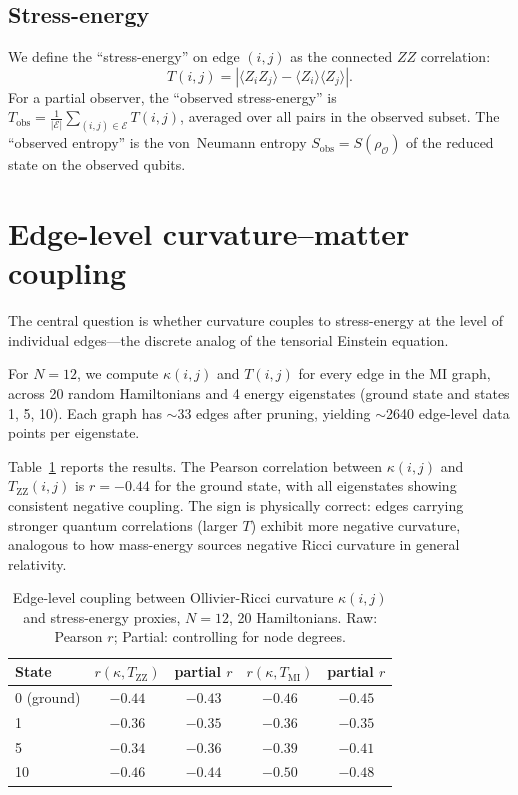 \documentclass[aps,pra,twocolumn,superscriptaddress,floatfix]{revtex4-2}
\begin{document}
\subsection{Stress-energy}

We define the ``stress-energy'' on edge $(i,j)$ as the
connected $ZZ$ correlation:
\begin{equation}
T(i,j) = |\langle Z_i Z_j \rangle - \langle Z_i \rangle
\langle Z_j \rangle|.
\label{eq:stress}
\end{equation}
For a partial observer, the ``observed stress-energy'' is
$T_\mathrm{obs} = \frac{1}{|\mathcal{E}|} \sum_{(i,j) \in \mathcal{E}} T(i,j)$,
averaged over all pairs in the observed subset.  The ``observed
entropy'' is the von~Neumann entropy $S_\mathrm{obs} = S(\rho_\mathcal{O})$
of the reduced state on the observed qubits.


\section{Edge-level curvature--matter coupling}
\label{sec:edge}

The central question is whether curvature couples to
stress-energy at the level of individual edges---the discrete
analog of the tensorial Einstein equation.

For $N = 12$, we compute $\kappa(i,j)$ and $T(i,j)$ for every
edge in the MI graph, across 20 random Hamiltonians and
4 energy eigenstates (ground state and states 1, 5, 10).
Each graph has $\sim$33 edges after pruning, yielding
$\sim$2640 edge-level data points per eigenstate.

Table~\ref{tab:edge} reports the results.  The Pearson
correlation between $\kappa(i,j)$ and $T_\mathrm{ZZ}(i,j)$
is $r = -0.44$ for the ground state, with all eigenstates
showing consistent negative coupling.  The sign is physically
correct: edges carrying stronger quantum correlations
(larger $T$) exhibit more negative curvature, analogous to
how mass-energy sources negative Ricci curvature in general
relativity.

\begin{table}[t]
\caption{Edge-level coupling between Ollivier-Ricci curvature
$\kappa(i,j)$ and stress-energy proxies, $N = 12$, 20 Hamiltonians.
Raw: Pearson $r$; Partial: controlling for node degrees.}
\label{tab:edge}
\begin{ruledtabular}
\begin{tabular}{lcccc}
State & $r(\kappa, T_\mathrm{ZZ})$ & partial $r$ &
$r(\kappa, T_\mathrm{MI})$ & partial $r$ \\
\hline
0 (ground) & $-0.44$ & $-0.43$ & $-0.46$ & $-0.45$ \\
1          & $-0.36$ & $-0.35$ & $-0.36$ & $-0.35$ \\
5          & $-0.34$ & $-0.36$ & $-0.39$ & $-0.41$ \\
10         & $-0.46$ & $-0.44$ & $-0.50$ & $-0.48$ \\
\end{tabular}
\end{ruledtabular}
\end{table}
\end{document}
